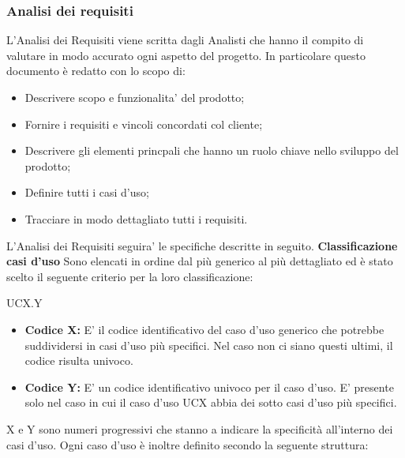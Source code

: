 \documentclass{article}
\begin{document}
    \subsubsection{Analisi dei requisiti}
    L'Analisi dei Requisiti viene scritta dagli Analisti che hanno il compito di valutare in modo accurato ogni aspetto del progetto. In particolare questo documento è redatto con lo scopo di:
    \begin{itemize}
    	\item Descrivere scopo e funzionalita' del prodotto;
    	\item Fornire i requisiti e vincoli concordati col cliente;
    	\item Descrivere gli elementi princpali che hanno un ruolo chiave nello sviluppo del prodotto;
    	\item Definire tutti i casi d'uso;
    	\item Tracciare in modo dettagliato tutti i requisiti.\newline
    \end{itemize}
    L'Analisi dei Requisiti seguira' le specifiche descritte in seguito.\newline \newline
    \textbf{Classificazione casi d'uso} Sono elencati in ordine dal più generico al più dettagliato ed è stato scelto il seguente criterio per la loro classificazione: \newline
    \begin{center}
    	UCX.Y
    \end{center}
    \begin{itemize}
    	\item \textbf{Codice X:} E' il codice identificativo del caso d'uso generico che potrebbe suddividersi
    	in casi d'uso più specifici. Nel caso non ci siano questi ultimi, il codice risulta univoco.
    	\item \textbf{Codice Y:} E' un codice identificativo univoco per il caso d'uso. E' presente solo nel
    	caso in cui il caso d'uso UCX abbia dei sotto casi d'uso più specifici.
    \end{itemize}
    X e Y sono numeri progressivi che stanno a indicare la specificità all'interno dei casi d'uso.\newline
    Ogni caso d'uso è inoltre definito secondo la seguente struttura:\newline
\end{document}
